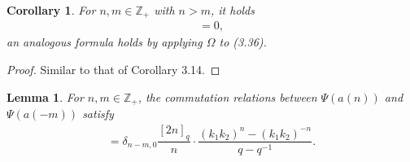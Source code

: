 \documentclass[12pt]{amsart}
\newtheorem{lemma}[theorem]{Lemma}
\newtheorem{coro}[theorem]{Corollary}
\numberwithin{equation}{section}
\numberwithin{equation}{section}
\begin{document}
\begin{coro} 
For \(n,m\in\mathbb{Z}_{+}\) with \(n>m\), it holds \begin{align}   
[\Psi(a(n)), \mathcal{F}_{m\delta}]=0, 
\end{align} 
an analogous formula holds by applying \(\Omega\) to (3.36).
\end{coro} 
\begin{proof}  
Similar to that of Corollary 3.14.
\end{proof} 

\begin{lemma}
For \(n,m\in\mathbb{Z}_{+}\), the commutation relations between \(\Psi(a(n))\) and \(\Psi(a(-m))\) satisfy  
\begin{align} 
[\Psi(a(n)), \Psi(a(-m))]  = \delta_{n-m,0}\dfrac{[2n]_q}{n} \cdot \dfrac{(k_1k_2)^{n} - (k_1k_2)^{-n}}{q - q^{-1}}.
\end{align}    
\end{lemma}  
\end{document}
